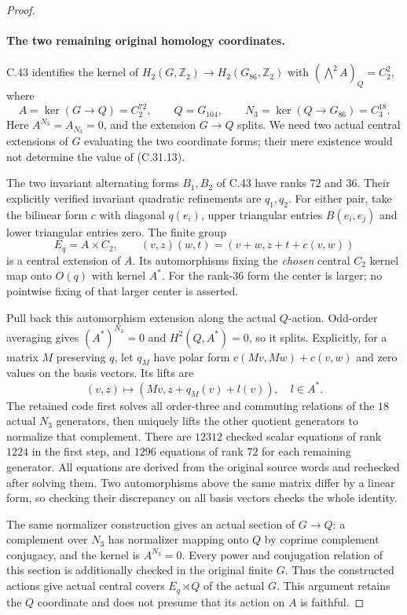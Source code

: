 \begin{proof}
\paragraph{The two remaining original homology coordinates.}
C.43 identifies the kernel of
$H_2(G,\mathbb Z_2)\to H_2(G_{86},\mathbb Z_2)$ with
$(\bigwedge^2 A)_Q=C_2^2$, where
\[
       A=\ker(G\to Q)=C_2^{72},\qquad Q=G_{104},\qquad
       N_3=\ker(Q\to G_{86})=C_3^{18}.
\]
Here $A^{N_3}=A_{N_3}=0$, and the extension $G\to Q$ splits.
We need two actual central extensions of $G$ evaluating the two
coordinate forms; their mere existence would not determine the
value of (C.31.13).

The two invariant alternating forms $B_1,B_2$ of C.43 have ranks
$72$ and $36$. Their explicitly verified invariant quadratic
refinements are $q_1,q_2$. For either pair, take the bilinear form
$c$ with diagonal $q(e_i)$, upper triangular entries $B(e_i,e_j)$
and lower triangular entries zero. The finite group
\[
 E_q=A\times C_2,\qquad
 (v,z)(w,t)=(v+w,z+t+c(v,w))
 \tag{C.31.14}
\]
is a central extension of $A$. Its automorphisms fixing the
\emph{chosen} central $C_2$ kernel map onto $O(q)$ with kernel
$A^*$. For the rank-$36$ form the center is larger; no pointwise
fixing of that larger center is asserted.

Pull back this automorphism extension along the actual $Q$-action.
Odd-order averaging gives $(A^*)^{N_3}=0$ and
$H^2(Q,A^*)=0$, so it splits. Explicitly, for a matrix $M$ preserving
$q$, let $q_M$ have polar form $c(Mv,Mw)+c(v,w)$ and zero values on
the basis vectors. Its lifts are
\[
              (v,z)\longmapsto(Mv,z+q_M(v)+l(v)),\quad l\in A^*.
 \tag{C.31.15}
\]
The retained code first solves all order-three and commuting
relations of the $18$ actual $N_3$ generators, then uniquely lifts
the other quotient generators to normalize that complement.
There are $12312$ checked scalar equations of rank $1224$ in the
first step, and $1296$ equations of rank $72$ for each remaining
generator. All equations are derived from the original source
words and rechecked after solving them. Two automorphisms above
the same matrix differ by a linear form, so checking their
discrepancy on all basis vectors checks the whole identity.

The same normalizer construction gives an actual section of
$G\to Q$: a complement over $N_3$ has normalizer mapping onto
$Q$ by coprime complement conjugacy, and the kernel is
$A^{N_3}=0$. Every power and conjugation relation of this section
is additionally checked in the original finite $G$. Thus the
constructed actions give actual central covers $E_q\rtimes Q$ of
the actual $G$. This argument retains the $Q$ coordinate and does
not presume that its action on $A$ is faithful.


\end{proof}
